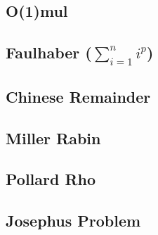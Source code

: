\documentclass[a4paper,10pt,twocolumn,oneside]{article}
\begin{document}
\subsection{O(1)mul}


% 

%

% 

\subsection{Faulhaber ($\sum\limits_{i=1}^{n}i^p$)}


\subsection{Chinese Remainder}


\subsection{Miller Rabin}


\subsection{Pollard Rho}


\subsection{Josephus Problem}


%
\end{document}
